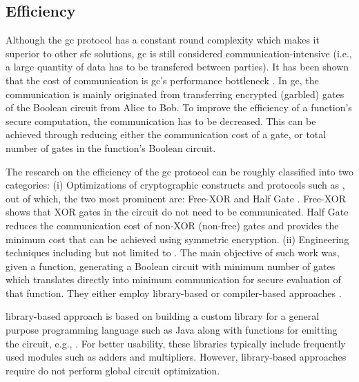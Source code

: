 \subsection{Efficiency}
Although the \acrshort{gc} protocol has a constant round complexity which makes it superior to other \acrshort{sfe} solutions, \acrshort{gc} is still considered communication-intensive (i.e., a large quantity of data has to be transfered between parties).
It has been shown that the cost of communication is \acrshort{gc}'s performance bottleneck \cite{}.
In \acrshort{gc}, the communication is mainly originated from transferring encrypted (garbled) gates of the Boolean circuit from Alice to Bob.
To improve the efficiency of a function's secure computation, the communication has to be decreased.
This can be achieved through reducing either the communication cost of a gate, or total number of gates in the function's Boolean circuit.

The research on the efficiency of the \acrshort{gc} protocol can be roughly classified into two categories:
(i) Optimizations of cryptographic constructs and protocols such as \cite{kolesnikov2008improved,pinkas2009secure,bellare2012foundations,bellare2013efficient,kolesnikov2014flexor,zahur2015two}, out of which, the two most prominent are: Free-XOR \cite{kolesnikov2008improved} and Half Gate \cite{zahur2015two}.
Free-XOR shows that XOR gates in the circuit do not need to be communicated.
Half Gate reduces the communication cost of non-XOR (non-free) gates and provides the minimum cost that can be achieved using symmetric encryption.
(ii) Engineering techniques including but not limited to \cite{henecka2010tasty,huang2011faster,henecka2013faster,kreuter2013pcf,franz2014cbmc,mood2016frigate}.
The main objective of such work was, given a function, generating a Boolean circuit with minimum number of gates which translates directly into minimum communication for secure evaluation of that function.
They either employ library-based \cite{huang2011faster,malka2011vmcrypt,henecka2013faster} or compiler-based approaches \cite{malkhi2004fairplay,kreuter2012billion,kreuter2013pcf,franz2014cbmc}.

library-based approach is based on building a custom library for a general purpose programming language such as Java along with functions for emitting the circuit, e.g., \cite{huang2011faster,malka2011vmcrypt,henecka2013faster}.
For better usability, these libraries typically include frequently used modules such as adders and multipliers.
However, library-based approaches require do not perform global circuit optimization.

